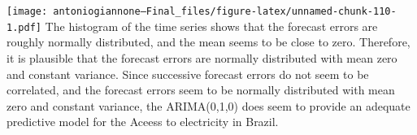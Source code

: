 \documentclass[
]{article}
\begin{document}
\texttt{[image: antoniogiannone---Final\_files/figure-latex/unnamed-chunk-110-1.pdf]}
The histogram of the time series shows that the forecast errors are
roughly normally distributed, and the mean seems to be close to zero.
Therefore, it is plausible that the forecast errors are normally
distributed with mean zero and constant variance. Since successive
forecast errors do not seem to be correlated, and the forecast errors
seem to be normally distributed with mean zero and constant variance,
the ARIMA(0,1,0) does seem to provide an adequate predictive model for
the Aceess to electricity in Brazil.
\end{document}
